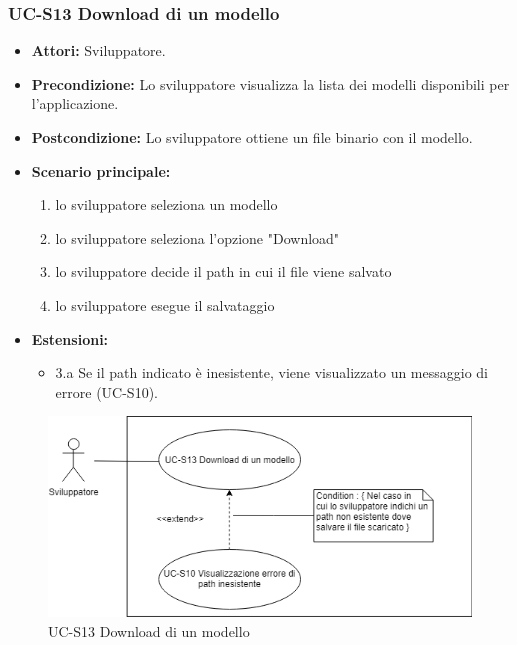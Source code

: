 	\subsubsection{UC-S13 Download di un modello}
		\begin{itemize}
			\item \textbf{Attori:} Sviluppatore.
			\item \textbf{Precondizione:} Lo sviluppatore visualizza la lista dei modelli disponibili per l'applicazione.
			\item \textbf{Postcondizione:} Lo sviluppatore ottiene un file binario con il modello.
			\item \textbf{Scenario principale:}
			\begin{enumerate}
				\item lo sviluppatore seleziona un modello
				\item lo sviluppatore seleziona l'opzione "Download"
				\item lo sviluppatore decide il path in cui il file viene salvato
				\item lo sviluppatore esegue il salvataggio
			\end{enumerate}
			\item \textbf{Estensioni:}
				\begin{itemize}
					\item 3.a Se il path indicato è inesistente, viene visualizzato un messaggio di errore (UC-S10).
				\end{itemize}
		\end{itemize}	
		
		\begin{figure}[h]
		\centering
		\includegraphics[scale=0.7]{images/UC-S13.png}
		\caption{UC-S13 Download di un modello}
		\end{figure}

